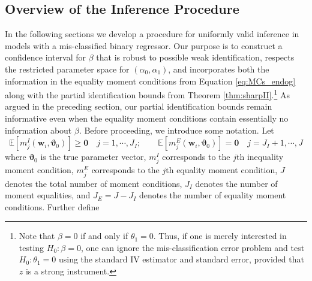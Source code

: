\subsection{Overview of the Inference Procedure}
In the following sections we develop a procedure for uniformly valid inference in models with a mis-classified binary regressor.
Our purpose is to construct a confidence interval for $\beta$ that is robust to possible weak identification, respects the restricted parameter space for $(\alpha_0, \alpha_1)$, and incorporates both the information in the equality moment conditions from Equation \ref{eq:MCs_endog} along with the partial identification bounds from Theorem \ref{thm:sharpII}.\footnote{Note that $\beta=0$ if and only if $\theta_1 = 0$. Thus, if one is merely interested in testing $H_0\colon \beta=0$, one can ignore the mis-classification error problem and test $H_0\colon \theta_1 = 0$ using the standard IV estimator and standard error, provided that $z$ is a strong instrument.}
As argued in the preceding section, our partial identification bounds remain informative even when the equality moment conditions contain essentially no information about $\beta$.
Before proceeding, we introduce some notation.
Let
\begin{equation}
  \mathbb{E} \left[ m^I_j(\mathbf{w}_i,\boldsymbol{\vartheta}_0) \right]
  \geq \mathbf{0} \quad j = 1, \cdots, J_I; \quad \quad
 \mathbb{E} \left[ m^E_j(\mathbf{w}_i,\boldsymbol{\vartheta}_0) \right]
 = \mathbf{0} \quad  j = J_I + 1, \cdots,J  
   \label{eq:mdefs}
 \end{equation}
 where $\boldsymbol{\vartheta}_0$ is the true parameter vector, $m_j^I$ corresponds to the $j$th inequality moment condition, $m_j^E$ corresponds to the $j$th equality moment condition, $J$ denotes the total number of moment conditions, $J_I$ denotes the number of moment equalities, and $J_E = J - J_I$ denotes the number of equality moment conditions.
Further define 
